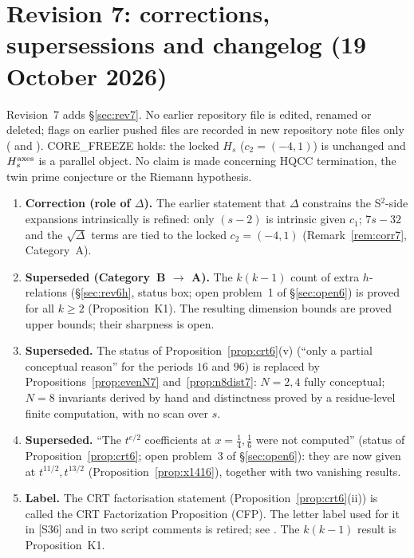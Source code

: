 \section{Revision 7: corrections, supersessions and changelog (19 October 2026)}\label{app:rev7}
Revision~7 adds \S\ref{sec:rev7}. No earlier repository file is edited, renamed or deleted; flags on earlier pushed files are recorded in new repository note files only ( and ). CORE\_FREEZE holds: the locked $H_s$ ($c_2=(-4,1)$) is unchanged and $H_s^{\rm axes}$ is a parallel object. No claim is made concerning HQCC termination, the twin prime conjecture or the Riemann hypothesis.
\begin{enumerate}[label={R7.\arabic*},leftmargin=3em]
\item \textbf{Correction (role of $\Delta$).} The earlier statement that $\Delta$ constrains the S$^2$-side expansions intrinsically is refined: only $(s-2)$ is intrinsic given $c_1$; $7s-32$ and the $\sqrt\Delta$ terms are tied to the locked $c_2=(-4,1)$ (Remark~\ref{rem:corr7}, Category~A).
\item \textbf{Superseded (Category~B $\to$ A).} The $k(k-1)$ count of extra $h$-relations (\S\ref{sec:rev6h}, status box; open problem~1 of \S\ref{sec:open6}) is proved for all $k\ge2$ (Proposition~K1). The resulting dimension bounds are proved upper bounds; their sharpness is open.
\item \textbf{Superseded.} The status of Proposition~\ref{prop:crt6}(v) (``only a partial conceptual reason'' for the periods $16$ and $96$) is replaced by Propositions~\ref{prop:evenN7} and~\ref{prop:n8dist7}: $N=2,4$ fully conceptual; $N=8$ invariants derived by hand and distinctness proved by a residue-level finite computation, with no scan over $s$.
\item \textbf{Superseded.} ``The $t^{e/2}$ coefficients at $x=\tfrac14,\tfrac16$ were not computed'' (status of Proposition~\ref{prop:crt6}; open problem~3 of \S\ref{sec:open6}): they are now given at $t^{11/2},t^{13/2}$ (Proposition~\ref{prop:x1416}), together with two vanishing results.
\item \textbf{Label.} The CRT factorisation statement (Proposition~\ref{prop:crt6}(ii)) is called the CRT Factorization Proposition (CFP). The letter label used for it in [S36] and in two script comments is retired; see . The $k(k-1)$ result is Proposition~K1.

\end{enumerate}
